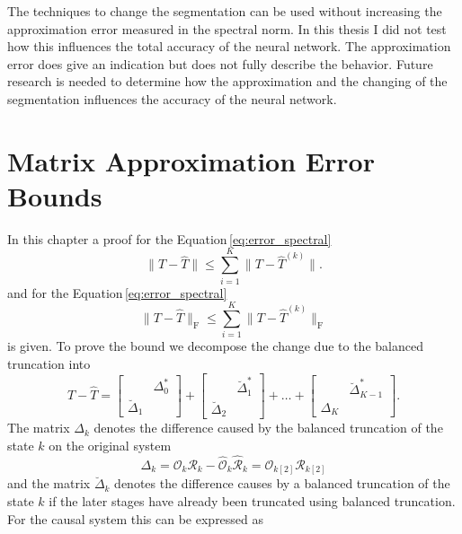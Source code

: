 \documentclass[doctype=mastersthesis,BCOR=15mm,biblatex]{ldvbook}%
\newcommand{\R}{\mathcal{R}} %
\newcommand{\Ob}{\mathcal{O}} %
\begin{document}
The techniques to change the segmentation can be used without increasing the approximation error measured in the spectral norm.
In this thesis I did not test how this influences the total accuracy of the neural network. 
The approximation error does give an indication but does not fully describe the behavior.
Future research is needed to determine how the approximation and the changing of the segmentation influences the accuracy of the neural network.


\appendix
\chapter{Matrix Approximation Error Bounds}\label{A:Error Bounds}

In this chapter a proof for the Equation\,\ref{eq:error_spectral}
\begin{equation}
\|T-\hat{T}\| \leq \sum_{i=1}^K \|T-\hat{T}^{(k)}\| .
\end{equation}
and for the Equation\,\ref{eq:error_spectral}
\begin{equation}
\|T-\hat{T}\|_\text{F} \leq \sum_{i=1}^K \|T-\hat{T}^{(k)}\|_\text{F}
\end{equation}
is given.
To prove the bound we decompose the change due to the balanced truncation into
\begin{equation}\label{eq:decomposition_approx_sum}
	T-\hat{T} =
	\begin{bmatrix}
	&\Delta_0^*\\
	\breve{\Delta}_1
	\end{bmatrix}
	+
	\begin{bmatrix}
	&\breve{\Delta}_1^*\\
	\breve{\Delta}_2
	\end{bmatrix}
	+\dots+
	\begin{bmatrix}
	&\breve{\Delta}_{K-1}^*\\
	\Delta_K
	\end{bmatrix}
	.
\end{equation}
The matrix $\Delta_k$ denotes the difference caused by the balanced truncation of the state $k$ on the original system
\begin{equation}
	\Delta_k = \Ob_{k}\R_{k} - \hat{\Ob}_k\hat{\R}_k = \Ob_{k[2]}\R_{k[2]}
\end{equation}
and the matrix $\breve{\Delta}_k$ denotes the difference causes by a balanced truncation of the state $k$ if the later stages have already been truncated using balanced truncation. 
For the causal system this can be expressed as 
\end{document}
